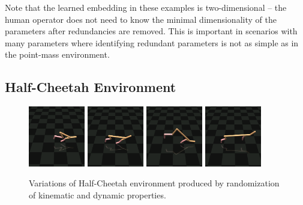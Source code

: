 \documentclass{article}
\begin{document}
Note that the learned embedding in these examples is two-dimensional -- 
the human operator does not need to know the minimal dimensionality of the parameters after redundancies are removed.
This is important in scenarios with many parameters where identifying redundant parameters 
is not as simple as in the point-mass environment.

\subsection{Half-Cheetah Environment}

\begin{figure}[ht]
\includegraphics[trim=4cm 3cm 0cm 4cm, clip, width=0.22\textwidth]{cheetah_short.png}\hfill
\includegraphics[trim=4cm 3cm 0cm 4cm, clip, width=0.22\textwidth]{cheetah_medium.png}\hfill
\includegraphics[trim=4cm 3cm 0cm 4cm, clip, width=0.22\textwidth]{cheetah_backleg.png}\hfill
\includegraphics[trim=4cm 3cm 0cm 4cm, clip, width=0.22\textwidth]{cheetah_long.png}
\caption{Variations of Half-Cheetah environment produced by randomization of kinematic and dynamic properties.}
\label{cheetahs}
\end{figure}
\end{document}
